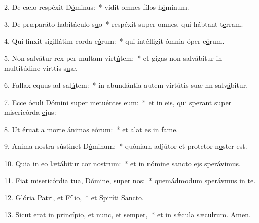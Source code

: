 2. De cælo respéxit D\uline{ó}minus:~* vidit omnes fílos h\uline{ó}minum.\par 
3. De præparáto habitáculo s\uline{u}o~* respéxit super omnes, qui hábtant t\uline{e}rram.\par 
4. Qui finxit sigillátim corda e\uline{ó}rum:~* qui intélligit ómnia óper e\uline{ó}rum.\par 
5. Non salvátur rex per multam virt\uline{ú}tem:~* et gigas non salvábitur in multitúdine virttis s\uline{u}æ.\par 
6. Fallax equus ad sal\uline{ú}tem:~* in abundántia autem virtútis suæ nn salv\uline{á}bitur.\par 
7. Ecce óculi Dómini super metuéntes \uline{e}um:~* et in eis, qui sperant super misericórda \uline{e}jus:\par 
8. Ut éruat a morte ánimas e\uline{ó}rum:~* et alat es in f\uline{a}me.\par 
9. Anima nostra sústinet D\uline{ó}minum:~* quóniam adjútor et protctor n\uline{o}ster est.\par 
10. Quia in eo lætábitur cor n\uline{o}strum:~* et in nómine sancto ejs sper\uline{á}vimus.\par 
11. Fiat misericórdia tua, Dómine, s\uline{u}per nos:~* quemádmodum sperávmus \uline{i}n te.\par 
12. Glória Patri, et F\uline{í}lio,~* et Spiríti S\uline{a}ncto.\par 
13. Sicut erat in princípio, et nunc, et s\uline{e}mper,~* et in sǽcula sæculrum. \uline{A}men.\par 

